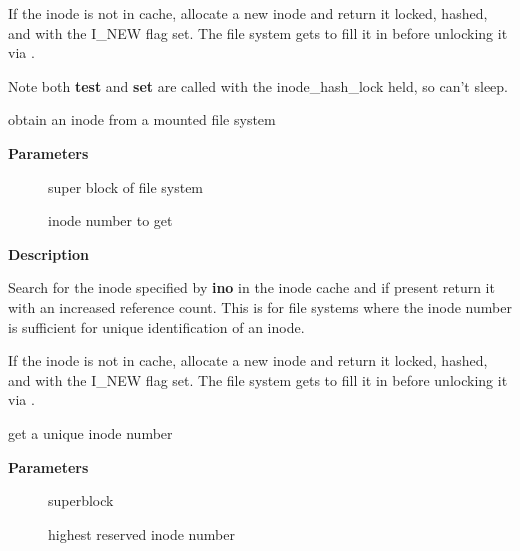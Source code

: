 \documentclass[a4paper,8pt,english]{sphinxmanual}
\begin{document}
If the inode is not in cache, allocate a new inode and return it locked,
hashed, and with the I\_NEW flag set. The file system gets to fill it in
before unlocking it via {\hyperref[filesystems/index:c.unlock_new_inode]{\emph{}}}.

Note both \textbf{test} and \textbf{set} are called with the inode\_hash\_lock held, so can't
sleep.

\begin{fulllineitems}
\label{filesystems/index:c.iget_locked}
obtain an inode from a mounted file system

\end{fulllineitems}


\textbf{Parameters}
\begin{description}
\item[{}] \leavevmode
super block of file system

\item[{}] \leavevmode
inode number to get

\end{description}

\textbf{Description}

Search for the inode specified by \textbf{ino} in the inode cache and if present
return it with an increased reference count. This is for file systems
where the inode number is sufficient for unique identification of an inode.

If the inode is not in cache, allocate a new inode and return it locked,
hashed, and with the I\_NEW flag set.  The file system gets to fill it in
before unlocking it via {\hyperref[filesystems/index:c.unlock_new_inode]{\emph{}}}.

\begin{fulllineitems}
\label{filesystems/index:c.iunique}
get a unique inode number

\end{fulllineitems}


\textbf{Parameters}
\begin{description}
\item[{}] \leavevmode
superblock

\item[{}] \leavevmode
highest reserved inode number

\end{description}
\end{document}
